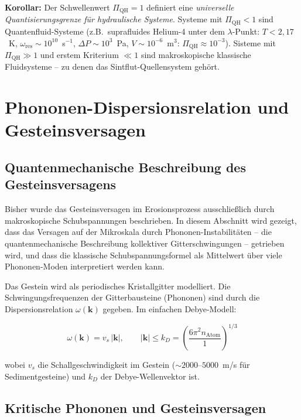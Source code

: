 ﻿\documentclass[12pt,a4paper]{report}
\begin{document}
\textbf{Korollar:} Der Schwellenwert $\Pi_\mathrm{QH} = 1$ definiert eine \textit{universelle Quantisierungsgrenze für hydraulische Systeme}. Systeme mit $\Pi_\mathrm{QH} < 1$ sind Quantenfluid-Systeme (z.B.\ suprafluides Helium-4 unter dem $\lambda$-Punkt: $T < 2{,}17$~K, $\omega_\mathrm{res} \sim 10^{10}$~s$^{-1}$, $\Delta P \sim 10^3$~Pa, $V \sim 10^{-6}$~m$^3$: $\Pi_\mathrm{QH} \approx 10^{-3}$). Sisteme mit $\Pi_\mathrm{QH} \gg 1$ und erstem Kriterium $\ll 1$ sind makroskopische klassische Fluidsysteme -- zu denen das Sintflut-Quellensystem gehört.

\section{Phononen-Dispersionsrelation und Gesteinsversagen}
\label{sec:phononen}

\subsection{Quantenmechanische Beschreibung des Gesteinsversagens}

Bisher wurde das Gesteinsversagen im Erosionsprozess ausschließlich durch makroskopische Schubspannungen beschrieben. In diesem Abschnitt wird gezeigt, dass das Versagen auf der Mikroskala durch Phononen-Instabilitäten -- die quantenmechanische Beschreibung kollektiver Gitterschwingungen -- getrieben wird, und dass die klassische Schubspannungsformel als Mittelwert über viele Phononen-Moden interpretiert werden kann.

Das Gestein wird als periodisches Kristallgitter modelliert. Die Schwingungsfrequenzen der Gitterbausteine (Phononen) sind durch die Dispersionsrelation $\omega(\mathbf{k})$ gegeben. Im einfachen Debye-Modell:

\begin{equation}
	\omega(\mathbf{k}) = v_s\,|\mathbf{k}|, \qquad |\mathbf{k}| \leq k_D = \left(\frac{6\pi^2 n_\mathrm{Atom}}{1}\right)^{1/3}
	\label{eq:debye_dispersion}
\end{equation}

wobei $v_s$ die Schallgeschwindigkeit im Gestein ($\sim 2000$--$5000$~m/s für Sedimentgesteine) und $k_D$ der Debye-Wellenvektor ist.

\subsection{Kritische Phononen und Gesteinsversagen}
\end{document}
